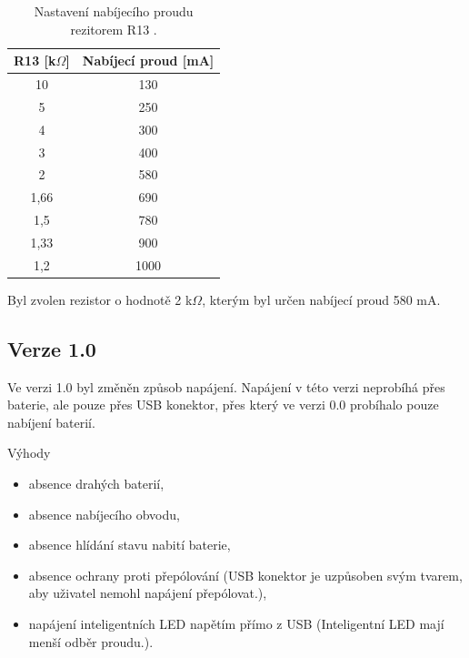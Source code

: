   \begin{table}[!h]
    \caption{Nastavení nabíjecího proudu rezitorem R13 \cite{TP4056_datasheet}.}
    \begin{center}
      \begin{tabular}{|c|c|}
          \hline
          R13 [k$\Omega$] & Nabíjecí proud [mA] \\
          \hline
          10      & 130 \\
          \hline
          5       & 250 \\
          \hline
          4       & 300 \\
          \hline
          3       & 400 \\
          \hline
          2       & 580 \\
          \hline
          1,66    & 690 \\
          \hline
          1,5     & 780 \\
          \hline
          1,33    & 900 \\
          \hline
          1,2     & 1000 \\
          \hline
      \end{tabular}  
    \end{center}
  \end{table}

  Byl zvolen rezistor o hodnotě 2 k$\Omega$, kterým byl určen nabíjecí proud 580 mA. 

  \subsection{Verze 1.0}
  Ve verzi 1.0 byl změněn způsob napájení. Napájení v této verzi neprobíhá přes baterie, ale pouze přes USB konektor, přes 
  který ve verzi 0.0 probíhalo pouze nabíjení baterií. 

  Výhody
  \begin{itemize}
    \item absence drahých baterií,
    \item absence nabíjecího obvodu,
    \item absence hlídání stavu nabití baterie,
    \item absence ochrany proti přepólování (USB konektor je uzpůsoben svým tvarem, aby uživatel nemohl napájení přepólovat.),
    \item napájení inteligentních LED napětím přímo z USB (Inteligentní LED mají menší odběr proudu.).
  \end{itemize}

